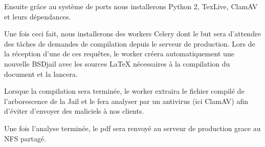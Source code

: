 \documentclass[10pt,a4paper]{article}
\begin{document}
Ensuite grâce au système de ports nous installerons Python 2, TexLive, ClamAV et leurs dépendances.


Une fois ceci fait, nous installerons des workers Celery dont le but sera d'attendre des tâches de demandes de compilation depuis le serveur de production.
Lors de la réception d'une de ces requêtes, le worker créera automatiquement une nouvelle BSDjail avec les sources \LaTeX { }nécessaires à la compilation du document et la lancera.

Lorsque la compilation sera terminée, le worker extraira le fichier compilé de l'arborescence de la Jail et le fera analyser par un antivirus (ici ClamAV) afin d'éviter d'envoyer des maliciels à nos clients.

Une fois l'analyse terminée, le pdf sera renvoyé au serveur de production grace au NFS partagé.
\end{document}
